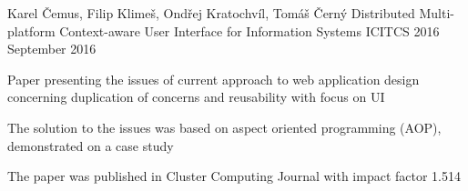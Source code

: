 \begin{cventries}
  \cventry
    {Karel \v{C}emus, Filip Klime\v{s}, Ond\v{r}ej Kratochv\'{i}l, Tom\'{a}\v{s} \v{C}ern\'{y}}
    {Distributed Multi-platform Context-aware User Interface for Information Systems}
    {ICITCS 2016}
    {September 2016}
    {
      \begin{cvitems}
        \item {Paper presenting the issues of current approach to web application design concerning duplication of concerns and reusability with focus on UI}
        \item {The solution to the issues was based on aspect oriented programming (AOP), demonstrated on a case study}
        \item {The paper was published in Cluster Computing Journal with impact factor 1.514}
      \end{cvitems}
    }
\end{cventries}
